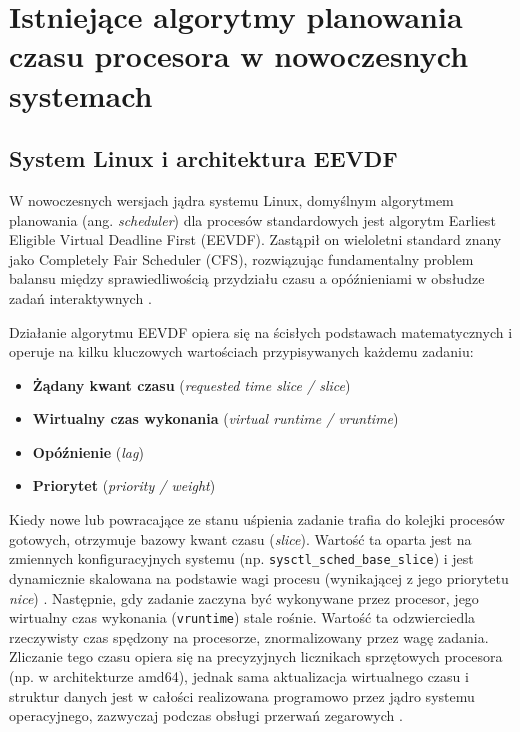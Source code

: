 \chapter{Istniejące algorytmy planowania czasu procesora w nowoczesnych systemach}
\label{ch:istniejace}

\section{System Linux i architektura EEVDF}
W nowoczesnych wersjach jądra systemu Linux, domyślnym algorytmem planowania (ang. \textit{scheduler}) dla procesów standardowych jest algorytm Earliest Eligible Virtual Deadline First (EEVDF). Zastąpił on wieloletni standard znany jako Completely Fair Scheduler (CFS), rozwiązując fundamentalny problem balansu między sprawiedliwością przydziału czasu a opóźnieniami w obsłudze zadań interaktywnych \cite{linuxdocEEVDF, lkmlSchedV612}. 

Działanie algorytmu EEVDF opiera się na ścisłych podstawach matematycznych \cite{stoica1995eevdf} i operuje na kilku kluczowych wartościach przypisywanych każdemu zadaniu:
\begin{itemize}
	\item \textbf{Żądany kwant czasu} (\textit{requested time slice / slice})
	\item \textbf{Wirtualny czas wykonania} (\textit{virtual runtime / vruntime})
	\item \textbf{Opóźnienie} (\textit{lag})
	\item \textbf{Priorytet} (\textit{priority / weight})
\end{itemize}

Kiedy nowe lub powracające ze stanu uśpienia zadanie trafia do kolejki procesów gotowych, otrzymuje bazowy kwant czasu (\textit{slice}). Wartość ta oparta jest na zmiennych konfiguracyjnych systemu (np. \texttt{sysctl\_sched\_base\_slice}) i jest dynamicznie skalowana na podstawie wagi procesu (wynikającej z jego priorytetu \textit{nice}) \cite{linuxFairC, lkmlRunToParity}. Następnie, gdy zadanie zaczyna być wykonywane przez procesor, jego wirtualny czas wykonania (\texttt{vruntime}) stale rośnie. Wartość ta odzwierciedla rzeczywisty czas spędzony na procesorze, znormalizowany przez wagę zadania. Zliczanie tego czasu opiera się na precyzyjnych licznikach sprzętowych procesora (np. w architekturze amd64), jednak sama aktualizacja wirtualnego czasu i struktur danych jest w całości realizowana programowo przez jądro systemu operacyjnego, zazwyczaj podczas obsługi przerwań zegarowych \cite{linuxSchedH, linuxFairC}.

